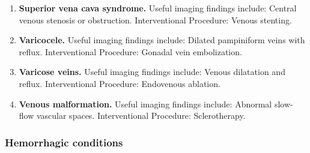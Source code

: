 \begin{enumerate}[leftmargin=*,itemsep=0.45em,topsep=0.4em]
\item \textbf{Superior vena cava syndrome.} Useful imaging findings include: Central venous stenosis or obstruction. Interventional Procedure: Venous stenting.
\item \textbf{Varicocele.} Useful imaging findings include: Dilated pampiniform veins with reflux. Interventional Procedure: Gonadal vein embolization.
\item \textbf{Varicose veins.} Useful imaging findings include: Venous dilatation and reflux. Interventional Procedure: Endovenous ablation.
\item \textbf{Venous malformation.} Useful imaging findings include: Abnormal slow-flow vascular spaces. Interventional Procedure: Sclerotherapy.
\end{enumerate}

\subsubsection{Hemorrhagic conditions}
